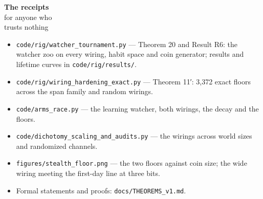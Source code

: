 \begin{receipts}{\textbf{The receipts}\\for anyone who\\trusts nothing}


\begin{itemize}
\tightlist
\item
  \texttt{code/\allowbreak{}rig/\allowbreak{}watcher\_\allowbreak{}tournament.\allowbreak{}py} --- Theorem 20 and Result R6: the
  watcher zoo on every wiring, habit space and coin generator; results
  and lifetime curves in \texttt{code/\allowbreak{}rig/\allowbreak{}results/\allowbreak{}}.
\item
  \texttt{code/\allowbreak{}rig/\allowbreak{}wiring\_\allowbreak{}hardening\_\allowbreak{}exact.\allowbreak{}py} --- Theorem 11′: 3,372 exact
  floors across the span family and random wirings.
\item
  \texttt{code/\allowbreak{}arms\_\allowbreak{}race.\allowbreak{}py} --- the learning watcher, both wirings, the decay
  and the floors.
\item
  \texttt{code/\allowbreak{}dichotomy\_\allowbreak{}scaling\_\allowbreak{}and\_\allowbreak{}audits.\allowbreak{}py} --- the wirings across world
  sizes and randomized channels.
\item
  \texttt{figures/\allowbreak{}stealth\_\allowbreak{}floor.\allowbreak{}png} --- the two floors against coin size; the
  wide wiring meeting the first-day line at three bits.
\item
  Formal statements and proofs: \texttt{docs/\allowbreak{}THEOREMS\_\allowbreak{}v1.\allowbreak{}md}.
\end{itemize}

\end{receipts}

\renewcommand{\partlist}{\partline{10}{Neighbors}{ch10}\partline{11}{The Fishing Town}{ch11}\partline{12}{A Conjecture, Fenced}{ch12}}\renewcommand{\runninghead}{Towns: Freedom Is Social}



